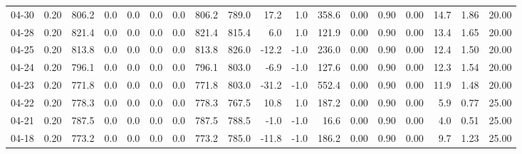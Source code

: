 \begin{threeparttable}
{\begin{tabular}{lrrrrrrrrrrrrrrrrr}
  04-30 &     0.20 & 806.2 &               0.0 &               0.0 &                0.0 &                0.0 & 806.2 & 789.0 &       17.2 &                      1.0 &               358.6 &       0.00 &      0.90 &           0.00 &             14.7 &            1.86 &                  20.00 \\
  04-28 &     0.20 & 821.4 &               0.0 &               0.0 &                0.0 &                0.0 & 821.4 & 815.4 &        6.0 &                      1.0 &               121.9 &       0.00 &      0.90 &           0.00 &             13.4 &            1.65 &                  20.00 \\
  04-25 &     0.20 & 813.8 &               0.0 &               0.0 &                0.0 &                0.0 & 813.8 & 826.0 &      -12.2 &                     -1.0 &               236.0 &       0.00 &      0.90 &           0.00 &             12.4 &            1.50 &                  20.00 \\
  04-24 &     0.20 & 796.1 &               0.0 &               0.0 &                0.0 &                0.0 & 796.1 & 803.0 &       -6.9 &                     -1.0 &               127.6 &       0.00 &      0.90 &           0.00 &             12.3 &            1.54 &                  20.00 \\
  04-23 &     0.20 & 771.8 &               0.0 &               0.0 &                0.0 &                0.0 & 771.8 & 803.0 &      -31.2 &                     -1.0 &               552.4 &       0.00 &      0.90 &           0.00 &             11.9 &            1.48 &                  20.00 \\
  04-22 &     0.20 & 778.3 &               0.0 &               0.0 &                0.0 &                0.0 & 778.3 & 767.5 &       10.8 &                      1.0 &               187.2 &       0.00 &      0.90 &           0.00 &              5.9 &            0.77 &                  25.00 \\
  04-21 &     0.20 & 787.5 &               0.0 &               0.0 &                0.0 &                0.0 & 787.5 & 788.5 &       -1.0 &                     -1.0 &                16.6 &       0.00 &      0.90 &           0.00 &              4.0 &            0.51 &                  25.00 \\
  04-18 &     0.20 & 773.2 &               0.0 &               0.0 &                0.0 &                0.0 & 773.2 & 785.0 &      -11.8 &                     -1.0 &               186.2 &       0.00 &      0.90 &           0.00 &              9.7 &            1.23 &                  25.00 \\

\end{tabular}}
\end{threeparttable}
